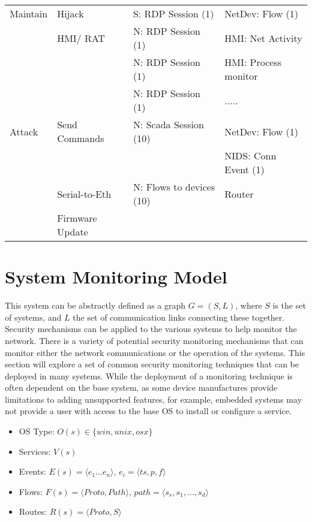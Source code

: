 \documentclass[journal]{IEEEtran}
\begin{document}
\begin{table}
\begin{tabular}{| p{1cm} p{1.3cm} ll |}
Maintain         & Hijack       		& S: RDP Session (1)       & NetDev: Flow (1)       \\
				 & HMI/ RAT             & N: RDP Session (1)       & HMI: Net Activity   \\
				 &                      & N: RDP Session (1)       & HMI: Process monitor    \\
				 &                      & N: RDP Session (1)       & .....   \\\hline
                 
                 
Attack           & Send Commands        & N: Scada Session (10)    & NetDev: Flow (1)        \\
                 &                      &                          & NIDS: Conn Event (1)   \\\hline

                 & Serial-to-Eth  		& N: Flows to devices (10) &  Router  \\
                 & Firmware Update      &                    \\\hline                   
\end{tabular}
\end{table}

\section{System Monitoring Model}
This system can be abstractly defined as a graph $G = (S, L)$, where $S$ is the set of systems, and $L$ the set of communication links connecting these together. Security mechanisms can be applied to the various systems to help monitor the network. There is a variety of potential security monitoring mechanisms that can monitor either the network communications or the operation of the systems.  This section will explore a set of common security monitoring techniques that can be deployed in many systems. While the deployment of a monitoring technique is often dependent on the base system, as some device manufactures provide limitations to adding unsupported features, for example, embedded systems may not provide a user with access to the base OS to install or configure a service. 

\begin{itemize}
\item OS Type: $O(s) \in \{win,unix,osx\}$
\item Services: $V(s)$ 
\item Events: $E(s) = \langle e_{1}...e_{n} \rangle$, $e_{i} = \langle ts, p, f\rangle$
\item Flows: $F(s) = \langle Proto, Path \rangle$, $path = \langle s_{s}, s_{1}, ..., s_{d} \rangle$
\item Routes: $R(s) = \langle Proto, S \rangle$ 
\end{itemize}
\end{document}
